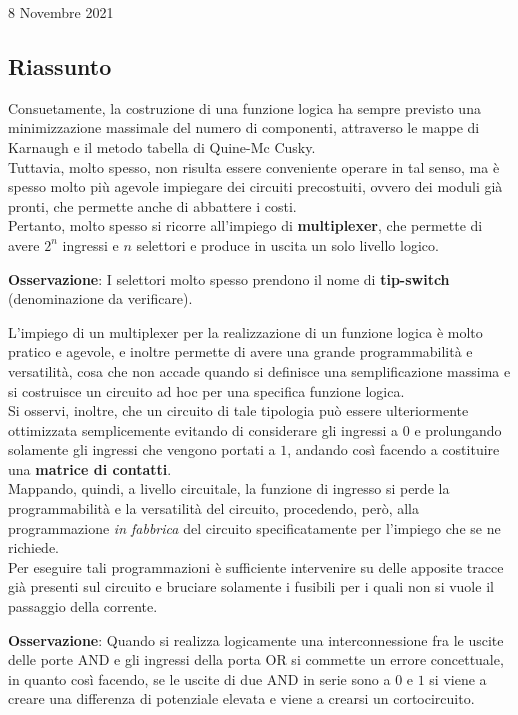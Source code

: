 \documentclass[a4paper]{extarticle}
\begin{document}
\newpage
\begin{center}
    8 Novembre 2021
\end{center}

\subsection{Riassunto}
Consuetamente, la costruzione di una funzione logica ha sempre previsto una minimizzazione massimale del numero di componenti, attraverso le mappe di Karnaugh e il metodo tabella di Quine-Mc Cusky.\\
Tuttavia, molto spesso, non risulta essere conveniente operare in tal senso, ma è spesso molto più agevole impiegare dei circuiti precostuiti, ovvero dei moduli già pronti, che permette anche di abbattere i costi.\\
Pertanto, molto spesso si ricorre all'impiego di \textbf{multiplexer}, che permette di avere \(2^n\) ingressi e \(n\) selettori e produce in uscita un solo livello logico.

\vspace{1em}
\noindent
\textbf{Osservazione}: I selettori molto spesso prendono il nome di \textbf{tip-switch} (denominazione da verificare).

\vspace{1em}
\noindent
L'impiego di un multiplexer per la realizzazione di un funzione logica è molto pratico e agevole, e inoltre permette di avere una grande programmabilità e versatilità, cosa che non accade quando si definisce una semplificazione massima e si costruisce un circuito ad hoc per una specifica funzione logica.\\
Si osservi, inoltre, che un circuito di tale tipologia può essere ulteriormente ottimizzata semplicemente evitando di considerare gli ingressi a \(0\) e prolungando solamente gli ingressi che vengono portati a \(1\), andando così facendo a costituire una \textbf{matrice di contatti}.\\
Mappando, quindi, a livello circuitale, la funzione di ingresso si perde la programmabilità e la versatilità del circuito, procedendo, però, alla programmazione \textit{in fabbrica} del circuito specificatamente per l'impiego che se ne richiede.\\
Per eseguire tali programmazioni è sufficiente intervenire su delle apposite tracce già presenti sul circuito e bruciare solamente i fusibili per i quali non si vuole il passaggio della corrente.

\vspace{1em}
\noindent
\textbf{Osservazione}: Quando si realizza logicamente una interconnessione fra le uscite delle porte AND e gli ingressi della porta OR si commette un errore concettuale, in quanto così facendo, se le uscite di due AND in serie sono a \(0\) e \(1\) si viene a creare una differenza di potenziale elevata e viene a crearsi un cortocircuito.
\end{document}
